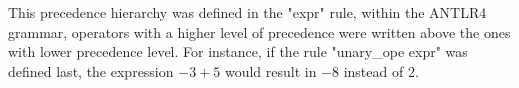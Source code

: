 \documentclass[12pt]{article}
\begin{document}
This precedence hierarchy was defined in the "expr" rule, within the ANTLR4 grammar, operators with a higher level of precedence were written above the ones with lower precedence level. For instance, if the rule "unary\_ope expr" was defined last, the expression $-3 + 5$ would result in $-8$ instead of $2$.


\end{document}
